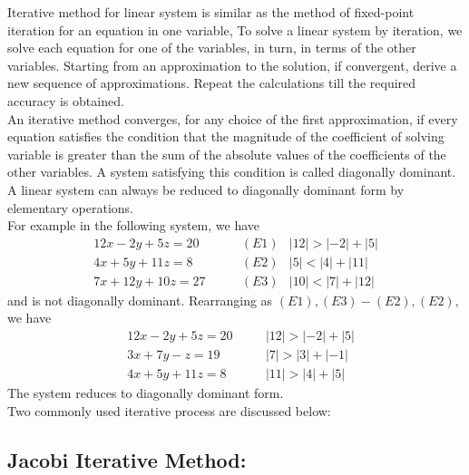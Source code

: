 \documentclass[12pt,class=book,crop=false]{standalone}
\begin{document}
Iterative method for linear system is similar as the method of fixed-point iteration for an equation in one variable,  To solve a linear system by iteration, we solve each equation for one of the variables, in turn, in terms of the other variables. Starting from an approximation to the solution, if convergent, derive a new sequence of approximations. Repeat the calculations till the required accuracy is obtained.\\
An iterative method converges, for any choice of the first approximation, if every equation satisfies the condition that the magnitude of the coefficient of solving variable is greater than the sum of the absolute values of the coefficients of the other variables. A system satisfying this condition is called diagonally dominant. A linear system can always be reduced to diagonally dominant form by elementary operations.\\


For example in the following system, we have
\begin{align*}
    12x-2y+5z=20  & \qquad(E1)  & \left|12\right|>\left|-2\right|+\left|5\right| \\
    4x+5y+11z=8   & \qquad(E2)  & \left|5\right|<\left|4\right|+\left|11\right|  \\
    7x+12y+10z=27 & \qquad (E3) & \left|10\right|<\left|7\right|+\left|12\right|
\end{align*}
and is not diagonally dominant.
Rearranging as $ (E1), (E3) -(E2),  (E2), $    we have
\begin{align*}
     & 12x-2y+5z=20 & \quad & \left|12\right|>\left|-2\right|+\left|5\right| \\
     & 3x+7y-z=19   & \quad & \left|7\right|>\left|3\right|+\left|-1\right|  \\
     & 4x+5y+11z=8  & \quad & \left|11\right|>\left|4\right|+\left|5\right|
\end{align*}
The system reduces to diagonally dominant form.\\
Two commonly used iterative process are discussed below:
\subsection{Jacobi Iterative Method:}
\end{document}
